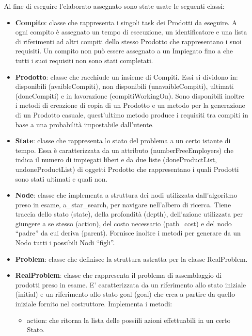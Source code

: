 \documentclass[]{article}
\begin{document}
	Al fine di eseguire l’elaborato assegnato sono state usate le seguenti classi:
	\begin{itemize}
		\item{\textbf{Compito}}: classe che rappresenta i singoli task dei Prodotti da eseguire. A ogni
			compito è assegnato un tempo di esecuzione, un identificatore e una lista di
			riferimenti ad altri compiti dello stesso Prodotto che rappresentano i suoi requisiti.
			Un compito non può essere assegnato a un Impiegato fino a che tutti i suoi requisiti
			non sono stati completati.
		\item{\textbf{Prodotto}}: classe che racchiude un insieme di Compiti. Essi si dividono in:
			disponibili (avaibleCompiti), non disponibili (unavaibleCompiti), ultimati
			(doneCompiti) e in lavorazione (compitiWorkingOn). Sono disponibili inoltre i
			metodi di creazione di copia di un Prodotto e un metodo per la generazione di un
			Prodotto casuale, quest’ultimo metodo produce i requisiti tra compiti in base a una
			probabilità impostabile dall’utente.
		\item{\textbf{State}}: classe che rappresenta lo stato del problema a un certo istante di tempo. Essa
			è caratterizzata da un attributo (numberFreeEmployers) che indica il numero di
			impiegati liberi e da due liste (doneProductList, undoneProductList) di oggetti
			Prodotto che rappresentano i quali Prodotti sono stati ultimati e quali non.
		\item{\textbf{Node}}: classe che implementa a struttura dei nodi utilizzata dall’algoritmo preso in
			esame, a\_star\_search, per navigare nell’albero di ricerca. Tiene traccia dello stato
			(state), della profondità (depth), dell’azione utilizzata per giungere a se stesso
			(action), del costo necessario (path\_cost) e del nodo “padre” da cui deriva (parent).
			Fornisce inoltre i metodi per generare da un Nodo tutti i possibili Nodi “figli”.
		\item{\textbf{Problem}}: classe che definisce la struttura astratta per la classe RealProblem.
		\item{\textbf{RealProblem}}: classe che rappresenta il problema di assemblaggio di prodotti preso
			in esame. E’ caratterizzata da un riferimento allo stato iniziale (initial) e un
			riferimento allo stato goal (goal) che crea a partire da quello iniziale fornito nel
			costruttore. Implementa i metodi:
			\begin{itemize}
				\item{action}: che ritorna la lista delle possiili azioni effettuabili in un certo Stato.

\end{itemize}
\end{itemize}
\end{document}
